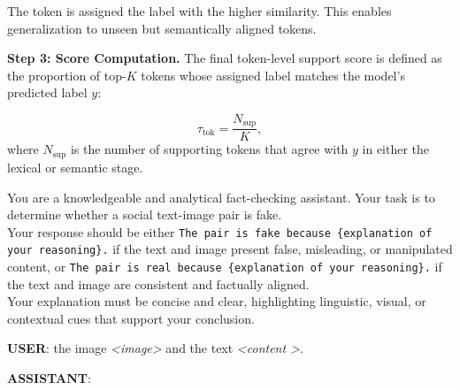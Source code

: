 The token is assigned the label with the higher similarity. This enables generalization to unseen but semantically aligned tokens.

\noindent\textbf{Step 3: Score Computation.} The final token-level support score is defined as the proportion of top-$K$ tokens whose assigned label matches the model's predicted label $y$:

\begin{equation}
\tau_{\text{tok}} = \frac{N_{\text{sup}}}{K},
\end{equation}
where $N_{\text{sup}}$ is the number of supporting tokens that agree with $y$ in either the lexical or semantic stage.



\begin{tcolorbox}[title=Prompt \textsc{II}: Fake News Detection without Retrieval, boxrule=0pt, left=1mm, right=1mm, top=1mm, bottom=1mm, fontupper=\small]
You are a knowledgeable and analytical fact-checking assistant. Your task is to determine whether a social text-image pair is fake.\\

Your response should be either \texttt{The pair is fake because \{explanation of your reasoning\}.} if the text and image present false, misleading, or manipulated content, or \texttt{The pair is real because \{explanation of your reasoning\}.} if the text and image are consistent and factually aligned.\\

Your explanation must be concise and clear, highlighting linguistic, visual, or contextual cues that support your conclusion.

\vspace{1mm}
\textbf{USER}: the image \textit{\textless image\textgreater} and the text \textit{\textless content \textgreater}.

\textbf{ASSISTANT}:
\end{tcolorbox}


